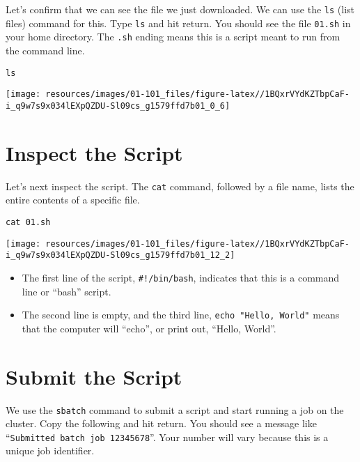 \documentclass[
]{book}
\providecommand{\tightlist}{%
  \setlength{\itemsep}{0pt}\setlength{\parskip}{0pt}}
\begin{document}
Let's confirm that we can see the file we just downloaded. We can use the \texttt{ls} (list files) command for this. Type \texttt{ls} and hit return. You should see the file \texttt{01.sh} in your home directory. The \texttt{.sh} ending means this is a script meant to run from the command line.

\begin{verbatim}
ls
\end{verbatim}

\texttt{[image: resources/images/01-101\_files/figure-latex//1BQxrVYdKZTbpCaF-i\_q9w7s9x034lEXpQZDU-Sl09cs\_g1579ffd7b01\_0\_6]}

\hypertarget{inspect-the-script}{%
\section{Inspect the Script}\label{inspect-the-script}}

Let's next inspect the script. The \texttt{cat} command, followed by a file name, lists the entire contents of a specific file.

\begin{verbatim}
cat 01.sh
\end{verbatim}

\texttt{[image: resources/images/01-101\_files/figure-latex//1BQxrVYdKZTbpCaF-i\_q9w7s9x034lEXpQZDU-Sl09cs\_g1579ffd7b01\_12\_2]}

\begin{itemize}
\tightlist
\item
  The first line of the script, \texttt{\#!/bin/bash}, indicates that this is a command line or ``bash'' script.
\item
  The second line is empty, and the third line, \texttt{echo\ "Hello,\ World"} means that the computer will ``echo'', or print out, ``Hello, World''.
\end{itemize}

\hypertarget{submit-the-script}{%
\section{Submit the Script}\label{submit-the-script}}

We use the \texttt{sbatch} command to submit a script and start running a job on the cluster. Copy the following and hit return. You should see a message like ``\texttt{Submitted\ batch\ job\ 12345678}''. Your number will vary because this is a unique job identifier.
\end{document}
